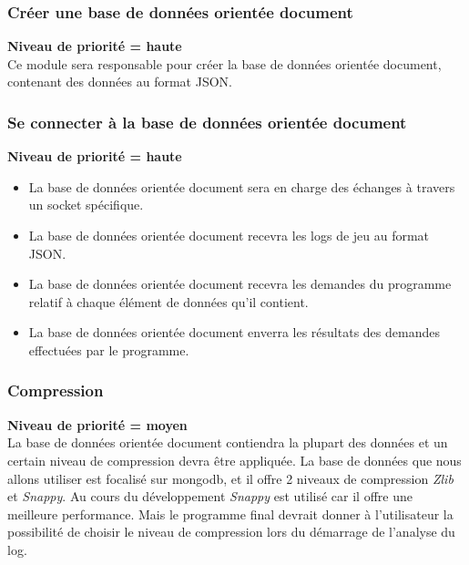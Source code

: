 \subsubsection{Créer une base de données orientée document }

\textbf{Niveau de priorité = haute}\\
Ce module sera responsable pour créer la base de données orientée document, contenant des données au format JSON.
\subsubsection{Se connecter à la base de données orientée document }
\textbf{Niveau de priorité = haute}\\
\begin{itemize}
\item La base de données orientée document sera en charge des échanges à travers un socket spécifique.
\item La base de données orientée document recevra les logs de jeu au format JSON.
\item La base de données orientée document recevra les demandes du programme relatif à chaque élément de données qu'il contient.
\item La base de données orientée document enverra les résultats des demandes effectuées par le programme.
\end{itemize}


\subsubsection{Compression}
\textbf{Niveau de priorité = moyen}\\

La base de données orientée document contiendra la plupart des données et un certain niveau de compression devra être appliquée.
La base de données que nous allons utiliser est focalisé sur mongodb, et il offre 2 niveaux de compression \textit{Zlib} et \textit{Snappy}.
Au cours du développement \textit{Snappy} est utilisé car il offre une meilleure performance.
Mais le programme final devrait donner à l'utilisateur la possibilité de choisir le niveau de compression lors du démarrage de l'analyse du log.


